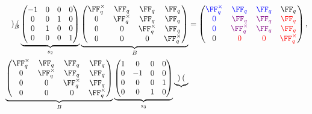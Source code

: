 \documentclass[11pt]{amsart}
\theoremstyle{remark}
\begin{document}
\begin{align*}
{\begin{pmatrix}
		\end{pmatrix}}_{B}
	\underbrace{\begin{pmatrix}
			-1 & 0 & 0 & 0 \\
			0  & 0 & 1 & 0 \\
			0  & 1 & 0 & 0 \\
			0  & 0 & 0 & 1
		\end{pmatrix}}_{s_2}
	\underbrace{\begin{pmatrix}
			\FF_q^\times & \FF_q        & \FF_q        & \FF_q        \\
			0            & \FF_q^\times & \FF_q        & \FF_q        \\
			0            & 0            & \FF_q^\times & \FF_q        \\
			0            & 0            & 0            & \FF_q^\times \\
		\end{pmatrix}}_{B} & =
	\begin{pmatrix}
		\color{blue}\FF_q^\times & \color{blue}\FF_q          & \color{blue}\FF_q   & \FF_q                   \\
		\color{blue}0            & \color{violet}\FF_q        & \color{violet}\FF_q & \color{red}\FF_q        \\
		\color{blue}0            & \color{violet}\FF_q^\times & \color{violet}\FF_q & \color{red}\FF_q        \\
		0                        & \color{red}0               & \color{red}0        & \color{red}\FF_q^\times
	\end{pmatrix},                     \\
	\underbrace{\begin{pmatrix}
			\FF_q^\times & \FF_q        & \FF_q        & \FF_q        \\
			0            & \FF_q^\times & \FF_q        & \FF_q        \\
			0            & 0            & \FF_q^\times & \FF_q        \\
			0            & 0            & 0            & \FF_q^\times \\
		\end{pmatrix}}_{B}
	\underbrace{\begin{pmatrix}
			1 & 0  & 0 & 0 \\
			0 & -1 & 0 & 0 \\
			0 & 0  & 0 & 1 \\
			0 & 0  & 1 & 0
		\end{pmatrix}}_{s_3}
	\underbrace{\begin{pmatrix}

\end{pmatrix}}
\end{align*}
\end{document}
